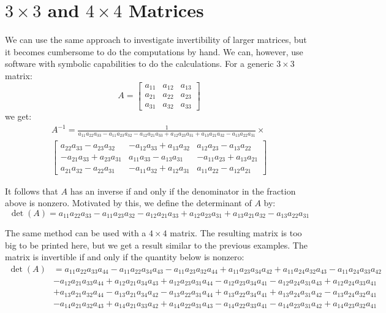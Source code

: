 \documentclass[12pt]{article}
\begin{document}
\section{$3\times3$ and $4\times4$ Matrices}

We can use the same approach to investigate invertibility of larger matrices, but it becomes cumbersome to do the computations by hand. We can, however, use software with symbolic capabilities to do the calculations. For a generic $3\times 3$ matrix:
\[
A=\left[\begin{matrix}a_{11} & a_{12} & a_{13}\\a_{21} & a_{22} & a_{23}\\a_{31} & a_{32} & a_{33}\end{matrix}\right]
\]
we get:
\begin{multline*}
A^{-1}=\frac{1}{a_{11} a_{22} a_{33} - a_{11} a_{23} a_{32} - a_{12} a_{21} a_{33} + a_{12} a_{23} a_{31} + a_{13} a_{21} a_{32} - a_{13} a_{22} a_{31}}\times\\
\left[\begin{matrix}a_{22} a_{33} - a_{23} a_{32} & - a_{12} a_{33} + a_{13} a_{32} & a_{12} a_{23} - a_{13} a_{22}\\- a_{21} a_{33} + a_{23} a_{31} & a_{11} a_{33} - a_{13} a_{31} & - a_{11} a_{23} + a_{13} a_{21}\\a_{21} a_{32} - a_{22} a_{31} & - a_{11} a_{32} + a_{12} a_{31} & a_{11} a_{22} - a_{12} 
a_{21}\end{matrix}\right]
\end{multline*}

It follows that $A$ has an inverse if and only if the denominator in the fraction above is nonzero. Motivated by this, we define the determinant of $A$ by:
\[
\det(A)=a_{11} a_{22} a_{33} - a_{11} a_{23} a_{32} - a_{12} a_{21} a_{33} + a_{12} a_{23} a_{31} + a_{13} a_{21} a_{32} - a_{13} a_{22} a_{31}
\]

The same method can be used with a $4\times4$ matrix. The resulting matrix is too big to be printed here, but we get a result similar to the previous examples. The matrix is invertible if and only if the quantity below is nonzero:
\begin{align*}
\det(A)&=
a_{11} a_{22} a_{33} a_{44} - a_{11} a_{22} a_{34} a_{43} - a_{11} a_{23} a_{32} a_{44} + a_{11} a_{23} a_{34} a_{42} + a_{11} a_{24} a_{32} a_{43} - a_{11} a_{24} a_{33} a_{42}\\
&- a_{12} a_{21} a_{33} a_{44} + a_{12} a_{21} a_{34} a_{43} + a_{12} a_{23} a_{31} a_{44} - a_{12} a_{23} a_{34} a_{41} - a_{12} a_{24} a_{31} a_{43} + a_{12} a_{24} a_{33} a_{41}\\
& + a_{13} a_{21} a_{32} a_{44} - a_{13} a_{21} a_{34} a_{42} - a_{13} a_{22} a_{31} a_{44} + a_{13} a_{22} a_{34} a_{41} + a_{13} a_{24} a_{31} a_{42} - a_{13} a_{24} a_{32} a_{41}\\
& - a_{14} a_{21} a_{32} a_{43} + a_{14} a_{21} a_{33} a_{42} + a_{14} a_{22} a_{31} a_{43} - a_{14} a_{22} a_{33} a_{41} - a_{14} a_{23} a_{31} a_{42} + a_{14} a_{23} a_{32} a_{41}
\end{align*}
\end{document}
